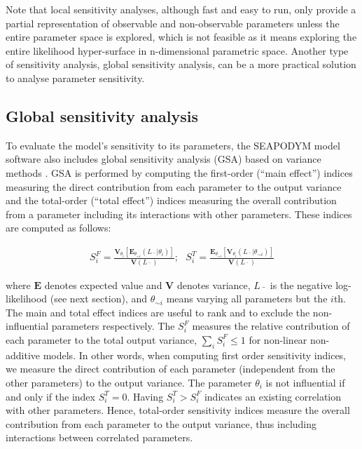 Note that local sensitivity analyses, although fast and easy to run, only provide a partial representation of observable and non-observable parameters unless the entire parameter space is explored, which is not feasible as it means exploring the entire likelihood hyper-surface in n-dimensional parametric space. Another type of sensitivity analysis, global sensitivity analysis, can be a more practical solution to analyse parameter sensitivity.

\subsection{Global sensitivity analysis}\label{sec:global-sa}

To evaluate the model's sensitivity to its parameters, the SEAPODYM model software also includes  global sensitivity analysis (GSA) based on variance methods \citep{Saltelli, Pianosi}. GSA is performed by computing the first-order (``main effect'') indices measuring the direct contribution from each parameter to the output variance and the total-order (``total effect'') indices measuring the overall contribution from a parameter including its interactions with other parameters. These indices are computed as follows:

\begin{align}
S^F_i = \frac{\mathbf{V}_{\theta_i}[\mathbf{E}_{\theta_{\sim i}}\left(L\bar{\text{ }}|\theta_i\right)]}{\mathbf{V}(L\bar{\text{ }})}; 
{\textbf{ }}
S^T_i = \frac{\mathbf{E}_{\theta_{\sim i}}[\mathbf{V}_{\theta_i}\left(L\bar{\text{ }}|\theta_{\sim i}\right)]}{\mathbf{V}(L\bar{\text{ }})} \label{eq:SA}
\end{align}

\noindent where $\mathbf{E}$ denotes expected value and $\mathbf{V}$ denotes variance, $L\bar{\text{ }}$ is the negative log-likelihood (see next section), and $\theta_{\sim i}$ means varying all parameters but the $i$th. The main and total effect indices are useful to rank and to exclude the non-influential parameters respectively. The $S^F_i$ measures the relative contribution of each parameter to the total output variance, $\sum_i{S^F_i} \leq 1$ for non-linear non-additive models. In other words, when computing first order sensitivity indices, we measure the direct contribution of each parameter (independent from the other parameters) to the output variance. The parameter $\theta_i$ is not influential if and only if the index $S^T_i=0$. Having $S^T_i>S^F_i$ indicates an existing correlation with other parameters. Hence, total-order sensitivity indices measure the overall contribution from each parameter to the output variance, thus including interactions between correlated parameters.


